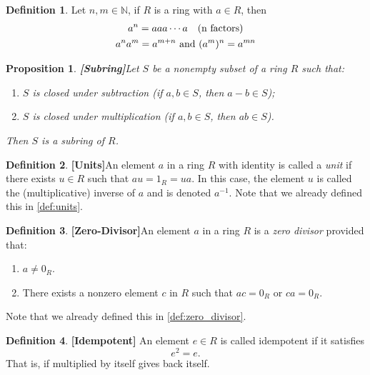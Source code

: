 \documentclass{article}
\newtheorem{proposition}{Proposition}[section]
\theoremstyle{definition}
\newtheorem{definition}{Definition}[section]
\theoremstyle{remark}
\begin{document}
\begin{definition}\label{ex:def of exponential}
Let $n,m \in \mathbb{N}$, if \(R\) is a ring with $a\in R$, then
\begin{gather*}
a^n = aaa\cdots a \quad (\textnormal{n factors})\\
a^na^m = a^{m+n} \textnormal{ and } (a^m)^n = a^{mn}
\end{gather*}


\end{definition}






\begin{proposition}\textbf{[Subring]}\label{thm:check for subring_p2}
Let $S$ be a nonempty subset of a ring $R$ such that:
\begin{enumerate}
\item $S$ is closed under subtraction (if $a, b \in S$, then $a - b \in S$);
\item $S$ is closed under multiplication (if $a, b \in S$, then $ab \in S$).
\end{enumerate}
Then $S$ is a subring of $R$.
\end{proposition}






\begin{definition}\textbf{[Units]}\label{def:units p2}
An element $a$ in a ring $R$ with identity is called a \textit{unit} if there exists $u \in R$ such that $au = 1_R = ua$. In this case, 
the element $u$ is called the (multiplicative) inverse of $a$ and is
denoted $a^{-1}$. Note that we already defined this in \ref{def:units}.
\end{definition}







\begin{definition}\textbf{[Zero-Divisor]}\label{def:zero divisor p2}
An element $a$ in a ring $R$ is a \textit{zero divisor} provided that:
\begin{enumerate}
\item $a \neq 0_R$.
\item There exists a nonzero element $c$ in $R$ such that $ac = 0_R$ or $ca = 0_R$.
\end{enumerate}
Note that we already defined this in \ref{def:zero_divisor}.
\end{definition}


\begin{definition}\textbf{[Idempotent]}
An element $e \in R$ is called idempotent if it satisfies
\[
e^2 = e.
\]
That is, if multiplied by itself gives back itself. 
\end{definition}
\end{document}
